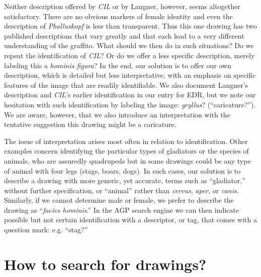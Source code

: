 \documentclass[amsthm,ebook]{saparticle}
\begin{document}
Neither description offered by \emph{CIL} or by Langner, however, seems altogether satisfactory. There are no obvious markers
of female identity and even the description of \emph{Phalluskopf} is less than transparent. Thus this one drawing has two
published descriptions that vary greatly and that each lead to a very different understanding of the graffito. What
should we then do in such situations? Do we repeat the identification of \emph{CIL}? Or do we offer a less specific
description, merely labeling this a \emph{hominis figura}? In the end, our solution is to offer our own description, which
is detailed but less interpretative, with an emphasis on specific features of the image that are readily identifiable.
We also document Langner’s description and \emph{CIL}’s earlier identification in our entry for EDR, but we note our
hesitation with such identification by labeling the image: \emph{gryllus}? (``caricature?''). We are aware, however, that we
also introduce an interpretation with the tentative suggestion this drawing might be a caricature. 

The issue of interpretation arises most often in relation to identification. Other examples concern identifying the
particular types of gladiators or the species of animals, who are assuredly quadrupeds but in some drawings could be
any type of animal with four legs (stags, boars, dogs). In such cases, our solution is to describe a drawing with more
generic, yet accurate, terms such as ``gladiator,'' without further specification, or ``animal'' rather than \emph{cervus}, \emph{aper},
or \emph{canis}. Similarly, if we cannot determine male or female, we prefer to describe the drawing as ``\emph{facies hominis}.'' In
the AGP search engine we can then indicate possible but not certain identification with a descriptor, or tag, that
comes with a question mark: e.g. ``stag?'' 




\section{How to search for drawings?}
\end{document}
